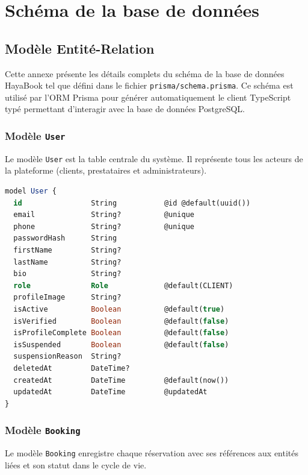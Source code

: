 \chapter{Schéma de la base de données}

\section{Modèle Entité-Relation}

Cette annexe présente les détails complets du schéma de la base de données HayaBook tel que défini dans le fichier \texttt{prisma/schema.prisma}. Ce schéma est utilisé par l'ORM Prisma pour générer automatiquement le client TypeScript typé permettant d'interagir avec la base de données PostgreSQL.

\subsection{Modèle \texttt{User}}

Le modèle \texttt{User} est la table centrale du système. Il représente tous les acteurs de la plateforme (clients, prestataires et administrateurs).

\begin{lstlisting}[language=SQL, caption={Champs principaux du modèle User (Prisma Schema)}]
model User {
  id                String           @id @default(uuid())
  email             String?          @unique
  phone             String?          @unique
  passwordHash      String
  firstName         String?
  lastName          String?
  bio               String?
  role              Role             @default(CLIENT)
  profileImage      String?
  isActive          Boolean          @default(true)
  isVerified        Boolean          @default(false)
  isProfileComplete Boolean          @default(false)
  isSuspended       Boolean          @default(false)
  suspensionReason  String?
  deletedAt         DateTime?
  createdAt         DateTime         @default(now())
  updatedAt         DateTime         @updatedAt
}
\end{lstlisting}

\subsection{Modèle \texttt{Booking}}

Le modèle \texttt{Booking} enregistre chaque réservation avec ses références aux entités liées et son statut dans le cycle de vie.

